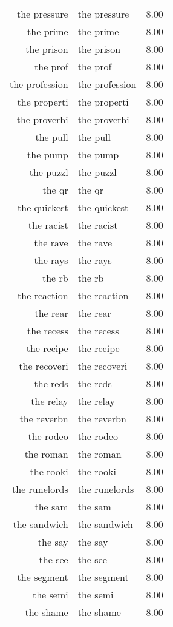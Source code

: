 \begin{table}[ht]
\begin{tabular}{rlr}
  the pressure & the pressure & 8.00 \\ 
  the prime & the prime & 8.00 \\ 
  the prison & the prison & 8.00 \\ 
  the prof & the prof & 8.00 \\ 
  the profession & the profession & 8.00 \\ 
  the properti & the properti & 8.00 \\ 
  the proverbi & the proverbi & 8.00 \\ 
  the pull & the pull & 8.00 \\ 
  the pump & the pump & 8.00 \\ 
  the puzzl & the puzzl & 8.00 \\ 
  the qr & the qr & 8.00 \\ 
  the quickest & the quickest & 8.00 \\ 
  the racist & the racist & 8.00 \\ 
  the rave & the rave & 8.00 \\ 
  the rays & the rays & 8.00 \\ 
  the rb & the rb & 8.00 \\ 
  the reaction & the reaction & 8.00 \\ 
  the rear & the rear & 8.00 \\ 
  the recess & the recess & 8.00 \\ 
  the recipe & the recipe & 8.00 \\ 
  the recoveri & the recoveri & 8.00 \\ 
  the reds & the reds & 8.00 \\ 
  the relay & the relay & 8.00 \\ 
  the reverbn & the reverbn & 8.00 \\ 
  the rodeo & the rodeo & 8.00 \\ 
  the roman & the roman & 8.00 \\ 
  the rooki & the rooki & 8.00 \\ 
  the runelords & the runelords & 8.00 \\ 
  the sam & the sam & 8.00 \\ 
  the sandwich & the sandwich & 8.00 \\ 
  the say & the say & 8.00 \\ 
  the see & the see & 8.00 \\ 
  the segment & the segment & 8.00 \\ 
  the semi & the semi & 8.00 \\ 
  the shame & the shame & 8.00 \\ 

\end{tabular}
\end{table}
